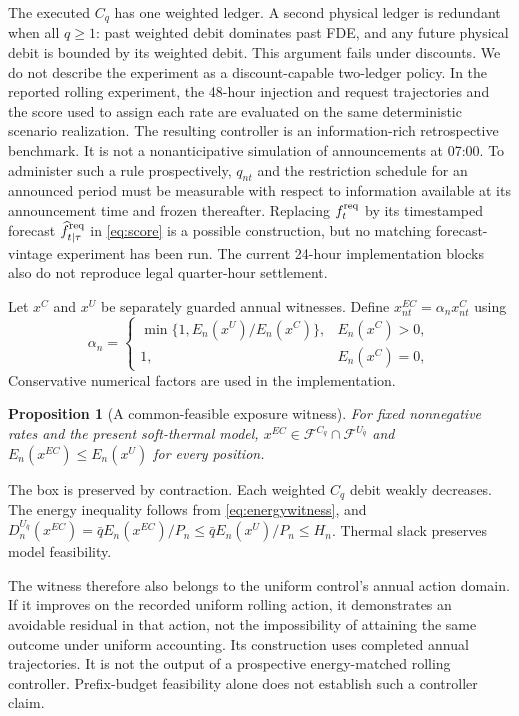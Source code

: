 \documentclass[10pt,journal]{IEEEtran}
\newtheorem{proposition}{Proposition}
\newcommand{\F}{\mathcal F}
\begin{document}
The executed $C_q$ has one weighted ledger. A second physical ledger is redundant when all $q\geq1$: past weighted debit dominates past FDE, and any future physical debit is bounded by its weighted debit. This argument fails under discounts. We do not describe the experiment as a discount-capable two-ledger policy. In the reported rolling experiment, the 48-hour injection and request trajectories and the score used to assign each rate are evaluated on the same deterministic scenario realization. The resulting controller is an information-rich retrospective benchmark. It is not a nonanticipative simulation of announcements at 07:00. To administer such a rule prospectively, $q_{nt}$ and the restriction schedule for an announced period must be measurable with respect to information available at its announcement time and frozen thereafter. Replacing $f_t^{\rm req}$ by its timestamped forecast $\widehat f_{t\mid\tau}^{\rm req}$ in \eqref{eq:score} is a possible construction, but no matching forecast-vintage experiment has been run. The current 24-hour implementation blocks also do not reproduce legal quarter-hour settlement.

Let $x^C$ and $x^U$ be separately guarded annual witnesses. Define $x^{EC}_{nt}=\alpha_nx^C_{nt}$ using
\begin{equation}
\alpha_n=\begin{cases}
\min\{1,E_n(x^U)/E_n(x^C)\},&E_n(x^C)>0,\\
1,&E_n(x^C)=0,
\end{cases}
\label{eq:energywitness}
\end{equation}
Conservative numerical factors are used in the implementation.

\begin{proposition}[A common-feasible exposure witness]
\label{prop:energywitness}
For fixed nonnegative rates and the present soft-thermal model, $x^{EC}\in\F^{C_q}\cap\F^{U_{\bar q}}$ and $E_n(x^{EC})\leq E_n(x^U)$ for every position.
\end{proposition}
\begin{IEEEproof}
The box is preserved by contraction. Each weighted $C_q$ debit weakly decreases. The energy inequality follows from \eqref{eq:energywitness}, and
$D_n^{U_{\bar q}}(x^{EC})=\bar q E_n(x^{EC})/P_n\leq\bar q E_n(x^U)/P_n\leq H_n$.
Thermal slack preserves model feasibility.
\end{IEEEproof}
The witness therefore also belongs to the uniform control's annual action domain. If it improves on the recorded uniform rolling action, it demonstrates an avoidable residual in that action, not the impossibility of attaining the same outcome under uniform accounting. Its construction uses completed annual trajectories. It is not the output of a prospective energy-matched rolling controller. Prefix-budget feasibility alone does not establish such a controller claim.
\end{document}
